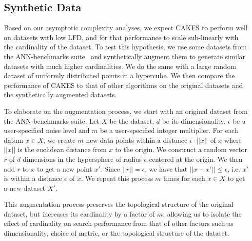 \subsection{Synthetic Data}
\label{subsec:methods:synthetic-data}

Based on our asymptotic complexity analyses, we expect CAKES to perform well on datasets with low LFD, and for that performance to scale sub-linearly with the cardinality of the dataset.
To test this hypothesis, we use some datasets from the ANN-benchmarks suite~\cite{aumuller2020ann} and synthetically augment them to generate similar datasets with much higher cardinalities.
We do the same with a large random dataset of uniformly distributed points in a hypercube.
We then compare the performance of CAKES to that of other algorithms on the original datasets and the synthetically augmented datasets.

To elaborate on the augmentation process, we start with an original dataset from the ANN-benchmarks suite.
Let $X$ be the dataset, $d$ be its dimensionality, $\epsilon$ be a user-specified noise level and $m$ be a user-specified integer multiplier.
For each datum $x \in X$, we create $m$ new data points within a distance $\epsilon \cdot ||x||$ of $x$ where $||x||$ is the euclidean distance from $x$ to the origin.
We construct a random vector $r$ of $d$ dimensions in the hypersphere of radius $\epsilon$ centered at the origin.
We then add $r$ to $x$ to get a new point $x'$.
Since $||r|| = \epsilon$, we have that $||x - x'|| \leq \epsilon$, i.e. $x'$ is within a distance $\epsilon$ of $x$.
We repeat this process $m$ times for each $x \in X$ to get a new dataset $X'$.

This augmentation process preserves the topological structure of the original dataset, but increases its cardinality by a factor of $m$, allowing us to isolate the effect of cardinality on search performance from that of other factors such as dimensionality, choice of metric, or the topological structure of the dataset.
